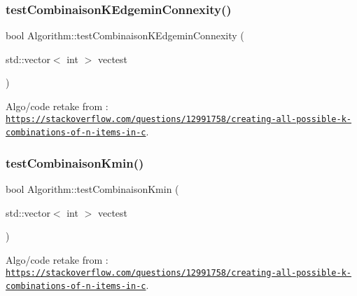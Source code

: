 \mbox{\label{struct_algorithm_aaaeee5af188d63af75b53a434310a584}} 
\subsubsection{\texorpdfstring{test\+Combinaison\+K\+Edgemin\+Connexity()}{testCombinaisonKEdgeminConnexity()}}
{\footnotesize\ttfamily bool Algorithm\+::test\+Combinaison\+K\+Edgemin\+Connexity (\begin{DoxyParamCaption}\item[{std\+::vector$<$ int $>$}]{vectest }\end{DoxyParamCaption})}



Algo/code retake from \+: \href{https://stackoverflow.com/questions/12991758/creating-all-possible-k-combinations-of-n-items-in-c}{\tt https\+://stackoverflow.\+com/questions/12991758/creating-\/all-\/possible-\/k-\/combinations-\/of-\/n-\/items-\/in-\/c}. 

\mbox{\label{struct_algorithm_a9531505ffb0b7f99320dee47e97376bc}} 
\subsubsection{\texorpdfstring{test\+Combinaison\+Kmin()}{testCombinaisonKmin()}}
{\footnotesize\ttfamily bool Algorithm\+::test\+Combinaison\+Kmin (\begin{DoxyParamCaption}\item[{std\+::vector$<$ int $>$}]{vectest }\end{DoxyParamCaption})}



Algo/code retake from \+: \href{https://stackoverflow.com/questions/12991758/creating-all-possible-k-combinations-of-n-items-in-c}{\tt https\+://stackoverflow.\+com/questions/12991758/creating-\/all-\/possible-\/k-\/combinations-\/of-\/n-\/items-\/in-\/c}. 

\mbox{\label{struct_algorithm_a31e619f383dba963efffd210250b7eec}} 
